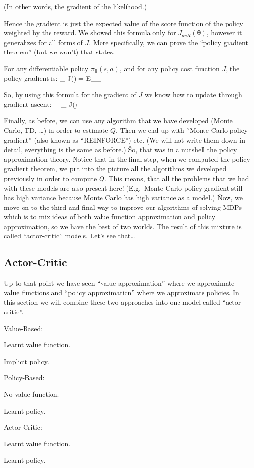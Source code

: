 (In other words, the gradient of the likelihood.)
\ed

Hence the gradient is just the expected value of the score function of the policy weighted by the reward. We showed
this formula only for $J_{avR}(\boldsymbol{\theta})$, however it generalizes for all forms of $J$. More
specifically, we can prove the ``policy gradient theorem'' (but we won't) that states:

For any differentiable policy $\pi_{\boldsymbol{\theta}}(s, a)$, and for any policy cost function $J$, the policy
gradient is:
\bse
\nabla_{\boldsymbol{\theta}} J(\boldsymbol{\theta}) = E_{\pi_{\boldsymbol{\theta}}} 
\ese
\et

So, by using this formula for the gradient of $J$ we know how to update through gradient ascent:
\bse
\boldsymbol{\theta} \coloneqq \boldsymbol{\theta} + \alpha \nabla_{\boldsymbol{\theta}} J(\boldsymbol{\theta})
\ese

Finally, as before, we can use any algorithm that we have developed (Monte Carlo, TD, \ldots) in order to estimate
$Q$. Then we end up with ``Monte Carlo policy gradient'' (also known as ``REINFORCE'') etc. (We will not write them
down in detail, everything is the same as before.) \v

So, that was in a nutshell the policy approximation theory. Notice that in the final step, when we computed the
policy gradient theorem, we put into the picture all the algorithms we developed previously in order to compute $Q$.
This means, that all the problems that we had with these models are also present here! (E.g.\ Monte Carlo policy
gradient still has high variance because Monte Carlo has high variance as a model.) \v

Now, we move on to the third and final way to improve our algorithms of solving MDPs which is to mix ideas of both
value function approximation and policy approximation, so we have the best of two worlds. The result of this
mixture is called ``actor-critic'' models. Let's see that\ldots

\subsection{Actor-Critic}

Up to that point we have seen ``value approximation'' where we approximate value functions and ``policy
approximation'' where we approximate policies. In this section we will combine these two approaches into one model
called ``actor-critic''.
\bit
\item Value-Based:
\bit
\item Learnt value function.
\item Implicit policy.
\eit
\item Policy-Based:
\bit
\item No value function.
\item Learnt policy.
\eit
\item Actor-Critic:
\bit
\item Learnt value function.
\item Learnt policy.
\eit
\eit

